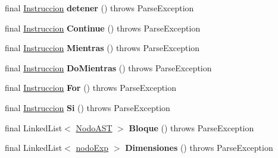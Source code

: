 \begin{DoxyCompactItemize}
\item 
\mbox{\label{classanalizadores_1_1_gramatica_a0ffdfae16a011d6191d93dabe0911df8}} 
final \mbox{\hyperlink{interfaceast_1_1_instruccion}{Instruccion}} {\bfseries detener} ()  throws Parse\+Exception 
\item 
\mbox{\label{classanalizadores_1_1_gramatica_ae3c2611d1d90622f3696cedd88010c7e}} 
final \mbox{\hyperlink{interfaceast_1_1_instruccion}{Instruccion}} {\bfseries Continue} ()  throws Parse\+Exception 
\item 
\mbox{\label{classanalizadores_1_1_gramatica_a4a77a7171a3fd0cd5eb8f9c4506afc39}} 
final \mbox{\hyperlink{interfaceast_1_1_instruccion}{Instruccion}} {\bfseries Mientras} ()  throws Parse\+Exception 
\item 
\mbox{\label{classanalizadores_1_1_gramatica_a1ea41dc3dd72e5823b0e99a7fd0cc0ba}} 
final \mbox{\hyperlink{interfaceast_1_1_instruccion}{Instruccion}} {\bfseries Do\+Mientras} ()  throws Parse\+Exception 
\item 
\mbox{\label{classanalizadores_1_1_gramatica_afe62720cfc2acacc9ddf158ad86d51cf}} 
final \mbox{\hyperlink{interfaceast_1_1_instruccion}{Instruccion}} {\bfseries For} ()  throws Parse\+Exception 
\item 
\mbox{\label{classanalizadores_1_1_gramatica_a28ef48d2daf3c88198bcc8872f5b5dfb}} 
final \mbox{\hyperlink{interfaceast_1_1_instruccion}{Instruccion}} {\bfseries Si} ()  throws Parse\+Exception 
\item 
\mbox{\label{classanalizadores_1_1_gramatica_acbab1ad9258b1765c0e75579cfa846a5}} 
final Linked\+List$<$ \mbox{\hyperlink{interfaceast_1_1_nodo_a_s_t}{Nodo\+A\+ST}} $>$ {\bfseries Bloque} ()  throws Parse\+Exception 
\item 
\mbox{\label{classanalizadores_1_1_gramatica_a0aa1504c58e6b340527e36b69c271552}} 
final Linked\+List$<$ \mbox{\hyperlink{classentorno_1_1nodo_exp}{nodo\+Exp}} $>$ {\bfseries Dimensiones} ()  throws Parse\+Exception 

\end{DoxyCompactItemize}
